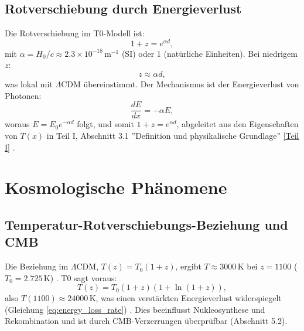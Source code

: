 \documentclass[12pt,a4paper]{article}
\newcommand{\Tfield}{T(x)}
\begin{document}
	\subsection{Rotverschiebung durch Energieverlust}
	\label{subsec:redshift_energy_loss}
	
	Die Rotverschiebung im T0-Modell ist:
	\begin{equation}
		1 + z = e^{\alpha d},
		\label{eq:redshift_distance}
	\end{equation}
	mit \(\alpha = H_0 / c \approx 2.3 \times 10^{-18} \, \text{m}^{-1}\) (SI) oder 1 (natürliche Einheiten). Bei niedrigem \(z\):
	\begin{equation}
		z \approx \alpha d,
		\label{eq:hubble_approx}
	\end{equation}
	was lokal mit \(\Lambda\)CDM übereinstimmt. Der Mechanismus ist der Energieverlust von Photonen:
	\begin{equation}
		\frac{dE}{dx} = -\alpha E,
		\label{eq:energy_loss_rate}
	\end{equation}
	woraus \(E = E_0 e^{-\alpha d}\) folgt, und somit \(1 + z = e^{\alpha d}\), abgeleitet aus den Eigenschaften von \(\Tfield\) in Teil I, Abschnitt 3.1 ''Definition und physikalische Grundlage'' \href{https://github.com/jpascher/T0-Time-Mass-Duality/tree/main/2/pdf/Deutsch/Bridging Quantum Mechanics and Relativity through Time-Mass Duality Part I Theoretical Foundations.pdf}{[Teil I]} \cite{pascher_messdifferenzen_2025}.
	
	\section{Kosmologische Phänomene}
	\label{sec:cosmological_phenomena}
	
	\subsection{Temperatur-Rotverschiebungs-Beziehung und CMB}
	\label{subsec:cmb_temp}
	
	Die Beziehung im \(\Lambda\)CDM, \(T(z) = T_0 (1 + z)\), ergibt \(T \approx 3000 \, \text{K}\) bei \(z = 1100\) (\(T_0 = 2.725 \, \text{K}\)) \cite{Fixsen2009}. T0 sagt voraus:
	\begin{equation}
		T(z) = T_0 (1 + z) (1 + \ln(1 + z)),
		\label{eq:temperature_redshift_simplified}
	\end{equation}
	also \(T(1100) \approx 24000 \, \text{K}\), was einen verstärkten Energieverlust widerspiegelt (Gleichung \ref{eq:energy_loss_rate}) \cite{pascher_temp_2025}. Dies beeinflusst Nukleosynthese und Rekombination und ist durch CMB-Verzerrungen überprüfbar (Abschnitt 5.2).
	
\end{document}

